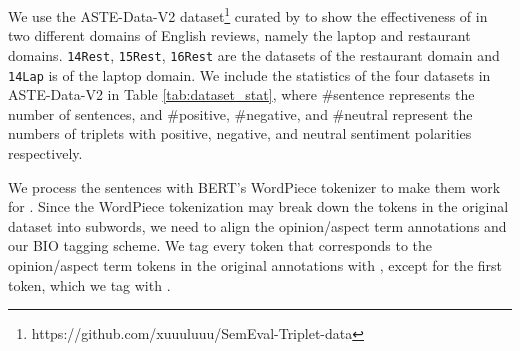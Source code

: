 \documentclass[sigconf]{acmart}
\begin{document}
\begin{table}[ht!]
\begin{table}[ht]
\caption{ASTE-Data-V2 Dataset Statistics}
\label{tab:dataset_stat}
\centering
{}
\vspace{-1em}
\end{table}

We use the ASTE-Data-V2 dataset\footnote{https://github.com/xuuuluuu/SemEval-Triplet-data} curated by \citet{xu2020position} to show the effectiveness of \mymodel{} in two different domains of English reviews, namely the laptop and restaurant domains. \texttt{14Rest}, \texttt{15Rest}, \texttt{16Rest} are the datasets of the restaurant domain and \texttt{14Lap} is of the laptop domain. We include the statistics of the four datasets in ASTE-Data-V2 in Table \ref{tab:dataset_stat}, where \#sentence represents the number of sentences, and \#positive, \#negative, and \#neutral represent the numbers of triplets with positive, negative, and neutral sentiment polarities respectively.

We process the sentences with BERT's WordPiece tokenizer \cite{wu2016google} to make them work for \mymodel{}. Since the WordPiece tokenization may break down the tokens in the original dataset into subwords, we need to align the opinion/aspect term annotations and our BIO tagging scheme. We tag every token that corresponds to the opinion/aspect term tokens in the original annotations with , except for the first token, which we tag with . 


\end{table}
\end{document}

